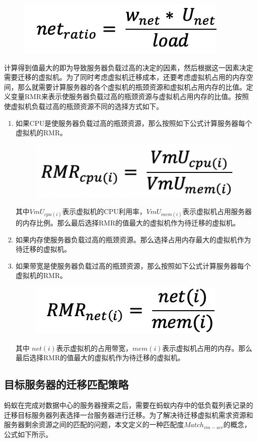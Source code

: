  \begin{figure}[htbp]
  \centering
  \includegraphics[width=0.3\linewidth]{./Figure/IMG_Chap3_11.png}
\end{figure}

计算得到值最大的即为导致服务器负载过高的决定的因素，然后根据这一因素决定需要迁移的虚拟机。为了同时考虑虚拟机迁移成本，还要考虑虚拟机占用的内存空间，那么就需要计算服务器的各个虚拟机的瓶颈资源和虚拟机占用内存的比值。定义变量RMR来表示使服务器负载过高的瓶颈资源与虚拟机占用内存的比值。按照使虚拟机负载过高的瓶颈资源不同的选择方式如下。

\begin{enumerate}[(1)]
    \item 如果CPU是使服务器负载过高的瓶颈资源，那么按照如下公式计算服务器每个虚拟机的RMR。

     \begin{figure}[htbp]
      \centering
      \includegraphics[width=0.3\linewidth]{./Figure/IMG_Chap3_12.png}
    \end{figure}

      其中$ VmU_{cpu(i)} $表示虚拟机的CPU利用率，$VmU_{mem(i)} $表示虚拟机占用服务器的内存比例。那么最后选择RMR的值最大的虚拟机作为待迁移的虚拟机。
    \item 如果内存使服务器负载过高的瓶颈资源。那么选择占用内存最大的虚拟机作为待迁移的虚拟机。
    \item 如果带宽是使服务器负载过高的瓶颈资源，那么按照如下公式计算服务器每个虚拟机的RMR。

    \begin{figure}[htbp]
      \centering
      \includegraphics[width=0.3\linewidth]{./Figure/IMG_Chap3_13.png}
    \end{figure}

    其中 $ net(i) $表示虚拟机的占用带宽，$ mem(i) $表示虚拟机占用的内存。那么最后选择RMR的值最大的虚拟机作为待迁移的虚拟机。
\end{enumerate}

\subsection{目标服务器的迁移匹配策略}
蚂蚁在完成对数据中心的服务器搜索之后，需要在蚂蚁内存中的低负载列表记录的迁移目标服务器列表选择一台服务器进行迁移。为了解决待迁移虚拟机需求资源和服务器剩余资源之间的匹配的问题，本文定义的一种匹配度$ Match_{vm-ser} $的概念，公式如下所示。

